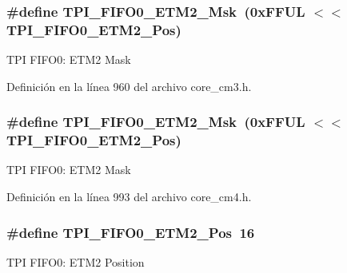 \subsubsection[{\texorpdfstring{T\+P\+I\+\_\+\+F\+I\+F\+O0\+\_\+\+E\+T\+M2\+\_\+\+Msk}{TPI_FIFO0_ETM2_Msk}}]{\setlength{\rightskip}{0pt plus 5cm}\#define T\+P\+I\+\_\+\+F\+I\+F\+O0\+\_\+\+E\+T\+M2\+\_\+\+Msk~(0x\+F\+F\+U\+L $<$$<$ T\+P\+I\+\_\+\+F\+I\+F\+O0\+\_\+\+E\+T\+M2\+\_\+\+Pos)}\hypertarget{group___c_m_s_i_s___t_p_i_gaa82a7b9b99c990fb12eafb3c84b68254}{}\label{group___c_m_s_i_s___t_p_i_gaa82a7b9b99c990fb12eafb3c84b68254}
T\+PI F\+I\+F\+O0\+: E\+T\+M2 Mask 

Definición en la línea 960 del archivo core\+\_\+cm3.\+h.

\subsubsection[{\texorpdfstring{T\+P\+I\+\_\+\+F\+I\+F\+O0\+\_\+\+E\+T\+M2\+\_\+\+Msk}{TPI_FIFO0_ETM2_Msk}}]{\setlength{\rightskip}{0pt plus 5cm}\#define T\+P\+I\+\_\+\+F\+I\+F\+O0\+\_\+\+E\+T\+M2\+\_\+\+Msk~(0x\+F\+F\+U\+L $<$$<$ T\+P\+I\+\_\+\+F\+I\+F\+O0\+\_\+\+E\+T\+M2\+\_\+\+Pos)}\hypertarget{group___c_m_s_i_s___t_p_i_gaa82a7b9b99c990fb12eafb3c84b68254}{}\label{group___c_m_s_i_s___t_p_i_gaa82a7b9b99c990fb12eafb3c84b68254}
T\+PI F\+I\+F\+O0\+: E\+T\+M2 Mask 

Definición en la línea 993 del archivo core\+\_\+cm4.\+h.

\subsubsection[{\texorpdfstring{T\+P\+I\+\_\+\+F\+I\+F\+O0\+\_\+\+E\+T\+M2\+\_\+\+Pos}{TPI_FIFO0_ETM2_Pos}}]{\setlength{\rightskip}{0pt plus 5cm}\#define T\+P\+I\+\_\+\+F\+I\+F\+O0\+\_\+\+E\+T\+M2\+\_\+\+Pos~16}\hypertarget{group___c_m_s_i_s___t_p_i_ga5f0037cc80c65e86d9e94e5005077a48}{}\label{group___c_m_s_i_s___t_p_i_ga5f0037cc80c65e86d9e94e5005077a48}
T\+PI F\+I\+F\+O0\+: E\+T\+M2 Position 

